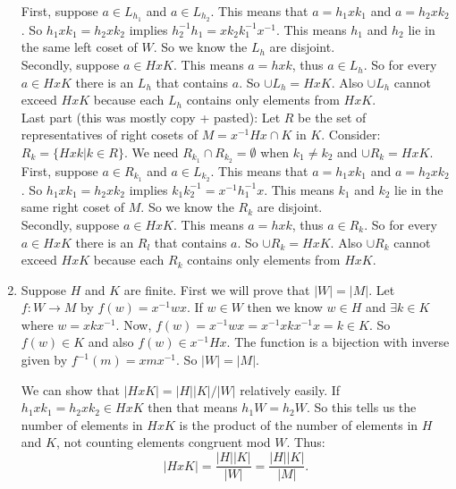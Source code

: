 \documentclass[12pt]{report}
\begin{document}
\begin{enumerate}
        First, suppose $a \in L_{h_1}$ and $a \in L_{h_2}$. This means that $a =
        h_1xk_1$ and $a = h_2xk_2$. So $h_1xk_1 = h_2xk_2$ implies $h_2^{-1}h_1=
        xk_2k_1^{-1}x^{-1}$. This means $h_1$ and $h_2$ lie in the same left
        coset of $W$. So we know the $L_h$ are disjoint.\\

        Secondly, suppose $a \in HxK$. This means $a = hxk$, thus $a \in L_h$.
        So for every $a \in HxK$ there is an $L_h$ that contains $a$. So $\cup
        L_h = HxK$. Also $\cup L_h$ cannot exceed $HxK$ because each $L_h$
        contains only elements from $HxK$.\\

        Last part (this was mostly copy + pasted): Let $R$ be the set of
        representatives of right cosets of $M = x^{-1}Hx \cap K$ in $K$.
        Consider: $R_k = \{ Hxk |  k \in R\}$. We need $R_{k_1} \cap R_{k_2} =
        \emptyset$ when $k_1 \neq k_2$ and $\cup R_k = HxK$.\\

        First, suppose $a \in R_{k_1}$ and $a \in L_{k_2}$. This means that $a =
        h_1xk_1$ and $a = h_2xk_2$. So $h_1xk_1 = h_2xk_2$ implies $k_1k_2^{-1}
        = x^{-1}h_1^{-1}x$. This means $k_1$ and $k_2$ lie in the same right
        coset of $M$. So we know the $R_k$ are disjoint.\\

        Secondly, suppose $a \in HxK$. This means $a = hxk$, thus $a \in R_k$.
        So for every $a \in HxK$ there is an $R_l$ that contains $a$. So $\cup
        R_k = HxK$. Also $\cup R_k$ cannot exceed $HxK$ because each $R_k$
        contains only elements from $HxK$.\\

  \item Suppose $H$ and $K$ are finite. First we will prove that $|W| = |M|$.
        Let $f: W \to M$ by $f(w) = x^{-1}wx$. If $w \in W$ then we know
        $w \in H$ and $\exists k \in K$ where $w = xkx^{-1}$. Now, $f(w) =
        x^{-1}wx = x^{-1}xkx^{-1}x = k \in K$. So $f(w) \in K$ and also $f(w)
        \in x^{-1}Hx$. The function is a bijection with inverse given by
        $f^{-1}(m) = xmx^{-1}$. So $|W| = |M|$.

        We can show that $|HxK| = |H||K|/|W|$ relatively easily. If $h_1xk_1 =
        h_2xk_2 \in HxK$ then that means $h_1W = h_2W$. So this tells us the
        number of elements in $HxK$ is the product of the number of elements in
        $H$ and $K$, not counting elements congruent mod $W$. Thus:
        $$|HxK| = \frac{|H||K|}{|W|} = \frac{|H||K|}{|M|}.$$

\end{enumerate}
\end{document}
